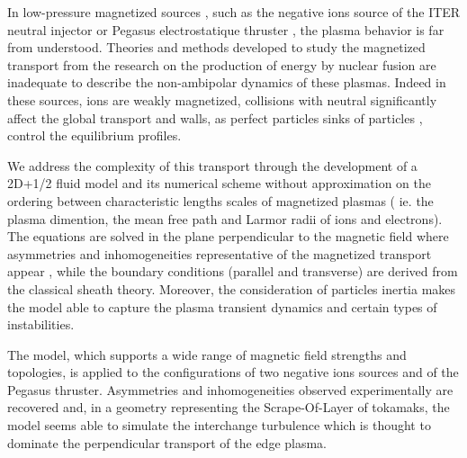 		In low-pressure magnetized sources , such as the negative ions source of the
		ITER neutral injector or Pegasus electrostatique thruster , the plasma
		behavior is far from understood. Theories and methods developed to study the
		magnetized transport from the research on the production of energy by nuclear
		fusion are inadequate to describe the non-ambipolar dynamics of these plasmas.
		Indeed in these sources, ions are weakly magnetized, collisions with neutral
		significantly affect the global transport and walls, as perfect particles
		sinks of particles , control the equilibrium profiles.

		We address the complexity of this transport through the development of a
		2D+1/2 fluid model and its numerical scheme without approximation on the
		ordering between characteristic lengths scales of magnetized plasmas ( ie. the
		plasma dimention, the mean free path and Larmor radii of ions and electrons).
		The equations are solved in the plane perpendicular to the magnetic field
		where asymmetries and inhomogeneities representative of the magnetized
		transport appear , while the boundary conditions (parallel and transverse) are
		derived from the classical sheath theory. Moreover, the consideration of
		particles inertia makes the model able to capture the plasma transient
		dynamics and certain types of instabilities.
	
		The model, which supports a wide range of magnetic field strengths and
		topologies, is applied to the configurations of two negative ions sources and
		of the Pegasus thruster. Asymmetries and inhomogeneities observed
		experimentally are recovered and, in a geometry representing the
		Scrape-Of-Layer of tokamaks, the model seems able to simulate the interchange
		turbulence which is thought to dominate the perpendicular transport of the
		edge plasma.
		  
		
